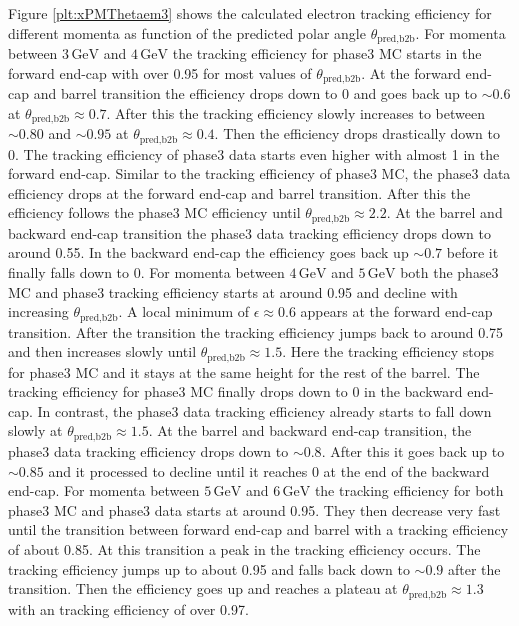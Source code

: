 \documentclass[a4paper,11pt,twosided,final,german,openbib,pdftex,listof=totoc,bibliography=totoc]{scrbook}
\begin{document}
Figure \ref{plt:xPMThetaem3} shows the calculated electron tracking efficiency for different momenta as function of the predicted polar angle $\theta_{\textrm{pred,b2b}}$.
For momenta between $3\,\textrm{GeV}$ and $4\,\textrm{GeV}$ the tracking efficiency for phase3 MC starts in the forward end-cap with over 0.95 for most values of $\theta_{\textrm{pred,b2b}}$. At the forward end-cap and barrel transition the efficiency drops down to 0 and goes back up to $\sim 0.6$ at $\theta_{\textrm{pred,b2b}} \approx 0.7$. After this the tracking efficiency slowly increases to between $\sim 0.80$ and $\sim 0.95$ at $\theta_{\textrm{pred,b2b}} \approx 0.4$. Then the efficiency drops drastically down to 0. The tracking efficiency of phase3 data starts even higher with almost 1 in the forward end-cap. Similar to the tracking efficiency of phase3 MC, the phase3 data efficiency drops at the forward end-cap and barrel transition. After this the efficiency follows the phase3 MC efficiency until $\theta_{\textrm{pred,b2b}} \approx 2.2$. At the barrel and backward end-cap transition the phase3 data tracking efficiency drops down to around 0.55. In the backward end-cap the efficiency goes back up $\sim 0.7$ before it finally falls down to 0.
For momenta between $4\,\textrm{GeV}$ and $5\,\textrm{GeV}$ both the phase3 MC and phase3 tracking efficiency starts at around 0.95 and decline with increasing $\theta_{\textrm{pred,b2b}}$. A local minimum of $\epsilon \approx 0.6$ appears at the forward end-cap transition. After the transition the tracking efficiency jumps back to around 0.75 and then increases slowly until $\theta_{\textrm{pred,b2b}} \approx 1.5$. Here the tracking efficiency stops for phase3 MC and it stays at the same height for the rest of the barrel. The tracking efficiency for phase3 MC finally drops down to 0 in the backward end-cap. In contrast, the phase3 data tracking efficiency already starts to fall down slowly at $\theta_{\textrm{pred,b2b}} \approx 1.5$. At the barrel and backward end-cap transition, the phase3 data tracking efficiency drops down to $\sim 0.8$. After this it goes back up to $\sim 0.85$ and it processed to decline until it reaches 0 at the end of the backward end-cap.
For momenta between $5\,\textrm{GeV}$ and $6\,\textrm{GeV}$ the tracking efficiency for both phase3 MC and phase3 data starts at around 0.95. They then decrease very fast until the transition between forward end-cap and barrel with a tracking efficiency of about 0.85. At this transition a peak in the tracking efficiency occurs. The tracking efficiency jumps up to about 0.95 and falls back down to $\sim 0.9$ after the transition. Then the efficiency goes up and reaches a plateau at $\theta_{\textrm{pred,b2b}} \approx 1.3$ with an tracking efficiency of over 0.97.
\end{document}
